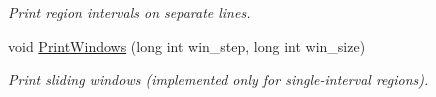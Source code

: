 \begin{CompactItemize}
\begin{CompactList}\small\item\em Print region intervals on separate lines. \item\end{CompactList}\item 
\hypertarget{classGenomicRegionGFF_3815f1b27aef231a674c527e11f25880}{
void \hyperlink{classGenomicRegionGFF_3815f1b27aef231a674c527e11f25880}{PrintWindows} (long int win\_\-step, long int win\_\-size)}
\label{classGenomicRegionGFF_3815f1b27aef231a674c527e11f25880}

\begin{CompactList}\small\item\em Print sliding windows (implemented only for single-interval regions). \item\end{CompactList}\end{CompactItemize}
